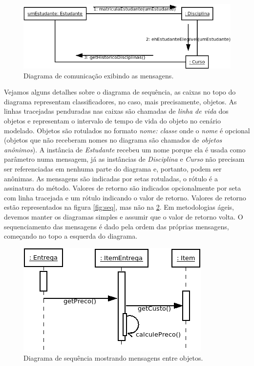 \documentclass[
	article,			%
	12pt,				%
	openright,
	twoside,			%
	a4paper,			%
	english,			%
	french,
	brazil,				%
	sumario=tradicional
	]{abntex2}
\begin{document}
\begin{figure}[h]
\begin{center}
\includegraphics[scale=0.6]{clsComm.png}
\end{center}
\caption{Diagrama de comunicação exibindo as mensagens.} \label{fig:comm}
\end{figure}

Vejamos alguns detalhes sobre o diagrama de sequência, as caixas no topo do diagrama representam classificadores, no caso, mais precisamente, objetos. As linhas tracejadas penduradas nas caixas são chamadas de \textit{linha de vida} dos objetos e representam o intervalo de tempo de vida do objeto no cenário modelado. Objetos são rotulados no formato \emph{nome: classe} onde o \emph{nome} é opcional (objetos que não receberam nomes no diagrama são chamados de \textit{objetos anônimos}). A instância de \emph{Estudante} recebeu um nome porque ela é usada como parâmetro numa mensagem, já as instâncias de \emph{Disciplina} e \emph{Curso} não precisam ser referenciadas em nenhuma parte do diagrama e, portanto, podem ser anônimas. As  mensagens são indicadas por setas rotuladas, o rótulo é a assinatura do método. Valores de retorno são indicados opcionalmente por seta com linha tracejada e um rótulo indicando o valor de retorno. Valores de retorno estão representados na figura \ref{fig:seq}, mas não na \ref{fig:seq2}. Em metodologias ágeis, devemos manter os diagramas simples e assumir que o valor de retorno volta. O sequenciamento das mensagens é dado pela ordem das próprias mensagens, começando no topo a esquerda do diagrama.

\begin{figure}
\begin{center}
\includegraphics[scale=0.65]{seq2.png}
\end{center}
\caption{Diagrama de sequência mostrando mensagens entre objetos.} \label{fig:seq2}
\end{figure}
\end{document}
